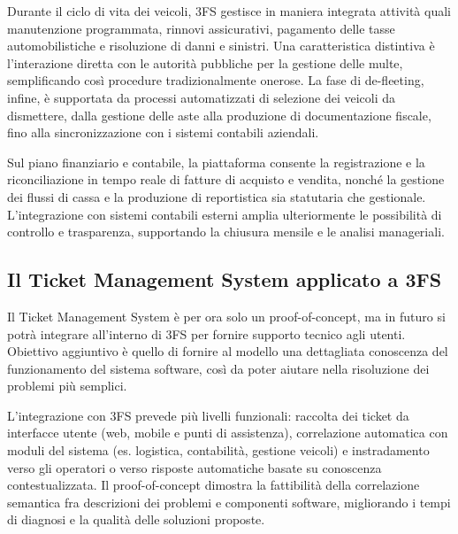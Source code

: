 Durante il ciclo di vita dei veicoli, 3FS{\textsuperscript{\tiny\textcopyright}} gestisce in maniera integrata attività quali manutenzione programmata, rinnovi assicurativi, 
pagamento delle tasse automobilistiche e risoluzione di danni e sinistri. Una caratteristica distintiva è l'interazione diretta con le autorità 
pubbliche per la gestione delle multe, semplificando così procedure tradizionalmente onerose. La fase di de-fleeting, infine, è supportata 
da processi automatizzati di selezione dei veicoli da dismettere, dalla gestione delle aste alla produzione di documentazione fiscale, fino 
alla sincronizzazione con i sistemi contabili aziendali.

Sul piano finanziario e contabile, la piattaforma consente la registrazione e la riconciliazione in tempo reale di fatture di acquisto e vendita, 
nonché la gestione dei flussi di cassa e la produzione di reportistica sia statutaria che gestionale. L'integrazione con sistemi contabili esterni 
amplia ulteriormente le possibilità di controllo e trasparenza, supportando la chiusura mensile e le analisi manageriali. \cite{progesoftware_3fs}

\subsection{\texorpdfstring{Il Ticket Management System applicato a 3FS{\textsuperscript{\tiny\textcopyright}}}{Il Ticket Management System applicato a 3FS (c)}}
Il Ticket Management System è per ora solo un proof-of-concept, ma in futuro si potrà integrare all'interno di 3FS{\textsuperscript{\tiny\textcopyright}} per fornire supporto tecnico agli utenti.
Obiettivo aggiuntivo è quello di fornire al modello una dettagliata conoscenza del funzionamento del sistema software, così da poter aiutare nella risoluzione
dei problemi più semplici.

L'integrazione con 3FS{\textsuperscript{\tiny\textcopyright}} prevede più livelli funzionali: raccolta dei ticket da interfacce utente (web, mobile e punti di assistenza), correlazione automatica
con moduli del sistema (es. logistica, contabilità, gestione veicoli) e instradamento verso gli operatori o verso risposte automatiche basate su conoscenza
contestualizzata. Il proof-of-concept dimostra la fattibilità della correlazione semantica fra descrizioni dei problemi e componenti software, migliorando 
i tempi di diagnosi e la qualità delle soluzioni proposte.

